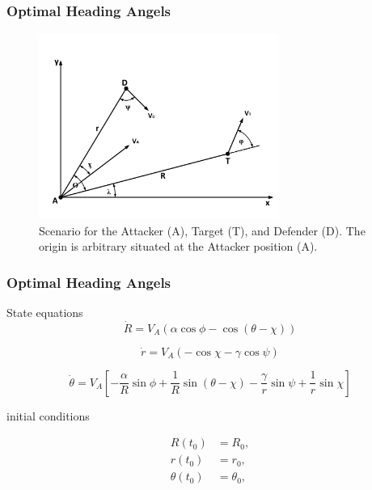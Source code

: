 \documentclass{beamer}
\begin{document}
\subsection{} 
\begin{frame}
\frametitle{Optimal Heading Angels}
\begin{figure}[H]
	\centering
	\includegraphics[width=0.7\textwidth]{fig/fig7-1.pdf}
	\caption{Scenario for the Attacker (A), Target (T), and Defender (D). The origin is arbitrary situated at the Attacker position (A).}
\end{figure}
\end{frame}
\begin{frame}
\frametitle{Optimal Heading Angels}
State equations
	\begin{equation}
	\dot{R} = V_A (\alpha \cos \phi - \cos(\theta - \chi))
	\label{Rdot}
	\end{equation}
	
	\begin{equation}
	\dot{r} = V_A (- \cos \chi - \gamma\cos\psi)
	\label{rdot}
	\end{equation}
	
	\begin{equation}
	\dot{\theta} = V_A [- \dfrac{\alpha}{R} \sin \phi + \dfrac{1}{R} \sin(\theta - \chi) - \dfrac{\gamma}{r} \sin \psi + \dfrac{1}{r}\sin \chi]
	\label{theta dot}
	\end{equation} 
	
initial conditions 
	
	\begin{equation*}
	\begin{split}
	R(t_0)&=R_0,\\
	r(t_0)&= r_0,\\
	\theta(t_0)&=\theta_0,
	\end{split}
	\end{equation*}
\end{frame}
\end{document}
